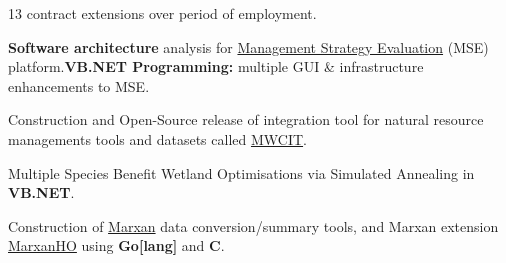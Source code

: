 \documentclass{resume}
\begin{document}
\begin{WorkHistory}
{      \item 13 contract extensions over period of employment.
      \item {\bfseries Software architecture} analysis for \href{http://track.org.au/publications/registry/track956}{Management Strategy Evaluation} (MSE) 
            platform.{\bfseries VB.NET Programming:} multiple GUI \& infrastructure enhancements to MSE.
      \item Construction and Open-Source release of integration tool for natural resource managements tools and datasets called \href{https://github.com/LindsayBradford/MWCIT}{MWCIT}. 
      \item {\bfseries} Multiple Species Benefit Wetland Optimisations via Simulated Annealing in {\bfseries VB.NET}.
      \item Construction of \href{http://www.uq.edu.au/marxan/}{Marxan} data conversion/summary tools, and Marxan extension \href{https://github.com/LindsayBradford/MarxanHO}{MarxanHO} using {\bfseries Go[lang]} and {\bfseries C}. 
    }
  \end{WorkHistory}
\end{document}
